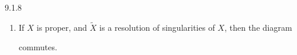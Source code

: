 \begin{variant}{9.1.8}
\begin{enumerate}
        
        commutes.
      


      
 \item[(ii)]
        If \(X\) is proper, and \(\widetilde {X}\) is a resolution of singularities of \(X\), then the diagram

        

        
        commutes.
      


\end{enumerate}
\end{variant}
